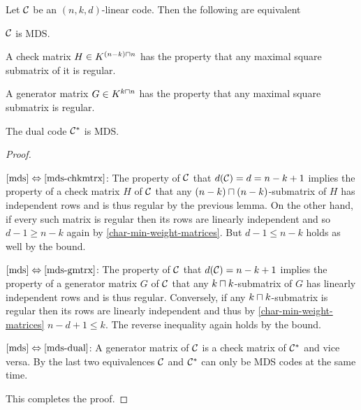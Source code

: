 \begin{lemma}\label{mdschar}
    Let $\mathcal{C}$ be an $(n,k,d)$-linear code. Then the following are equivalent
    \begin{statements}
            \item\label{mds} $\mathcal{C}$ is MDS.
            \item\label{mds-chkmtrx} A check matrix $H \in K^{(n-k)\setprod n}$ has the property that any maximal square submatrix of it is regular.
            \item\label{mds-gmtrx} A generator matrix $G \in K^{k\setprod n}$ has the property that any maximal square submatrix is regular.
            \item\label{mds-dual} The dual code ${\mathcal{C}}^{\ast}$ is MDS.
    \end{statements}
\end{lemma}

\begin{proof}
    \begin{implications}
            \item[$\autoref{mds}\equival\autoref{mds-chkmtrx}$:]
        The property of $\mathcal{C}$ that $d(\mathcal{C})=d=n-k+1$ implies the property of a check matrix $H$ of $\mathcal{C}$ that any $(n-k)\setprod (n-k)$-submatrix of $H$ has independent rows and is thus regular by the previous lemma. On the other hand, if every such matrix is regular then its rows are linearly independent and so $d-1\geq n-k$ again by \autoref{char-min-weight-matrices}. But $d-1\leq n-k$ holds as well by the  bound.
            \item[$\autoref{mds}\equival\autoref{mds-gmtrx}$:]
        The property of $\mathcal{C}$ that $d(\mathcal{C})=n-k+1$ implies the property of a generator matrix $G$ of $\mathcal{C}$ that any $k\setprod k$-submatrix of $G$ has linearly independent rows and is thus regular. Conversely, if any $k\setprod k$-submatrix is regular then its rows are linearly independent and thus by \autoref{char-min-weight-matrices} $n-d+1\leq k$. The reverse inequality again holds by the  bound. 
            \item[$\autoref{mds}\equival\autoref{mds-dual}$:]
        A generator matrix of $\mathcal{C}$ is a check matrix of ${\mathcal{C}}^{\ast}$ and vice versa. By the last two equivalences $\mathcal{C}$ and ${\mathcal{C}}^{\ast}$ can only be MDS codes at the same time. 
    \end{implications}%
This completes the proof.
\end{proof}

